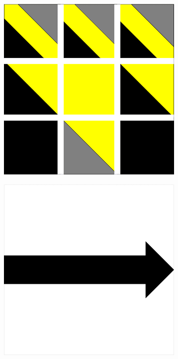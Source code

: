 \documentclass[a4paper]{article}
\begin{document}
\newpage
\begin{figure}[!h]
    \centering
    \begin{subfigure}[t]{0.17\textwidth}
        \includegraphics[width=\textwidth]{img/rule20.png}
    \end{subfigure}
    \hfill
    \begin{subfigure}[t]{0.17\textwidth}
        \includegraphics[width=\textwidth]{img/fleche3.png}

\end{subfigure}
\end{figure}
\end{document}
